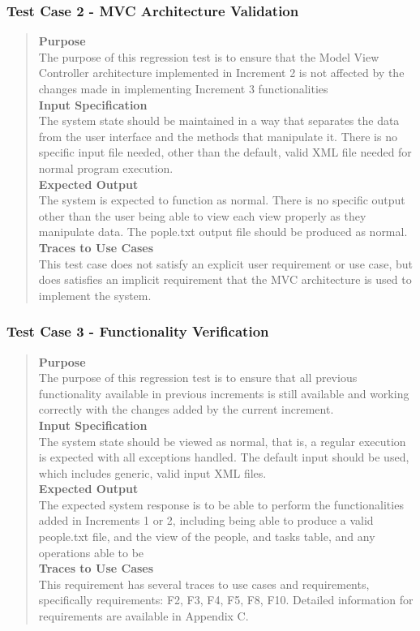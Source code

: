 \documentclass[12pt]{article}
\begin{document}
\subsubsection {Test Case 2 - MVC Architecture Validation}
\begin{quote}
{\bf Purpose}
\\
{
The purpose of this regression test is to ensure that the Model View Controller architecture implemented in Increment 2 is not affected by the changes made in implementing Increment 3 functionalities
}
\\
{\bf Input Specification}
\\
{
The system state should be maintained in a way that separates the data from the user interface and the methods that manipulate it. There is no specific input file needed, other than the default, valid XML file needed for normal program execution.
}
\\
{\bf Expected Output}
\\
{
The system is expected to function as normal. There is no specific output other than the user being able to view each view properly as they manipulate data. The pople.txt output file should be produced as normal.
}
\\
{\bf Traces to Use Cases}
\\
{
This test case does not satisfy an explicit user requirement or use case, but does satisfies an implicit requirement that the MVC architecture is used to implement the system.
}
\end{quote}
\subsubsection{Test Case 3 - Functionality Verification}
\begin{quote}
{\bf Purpose}
\\
{
The purpose of this regression test is to ensure that all previous functionality available in previous increments is still available and working correctly with the changes added by the current increment.
}
\\
{\bf Input Specification}
\\
{
The system state should be viewed as normal, that is, a regular execution is expected with all exceptions handled. The default input should be used, which includes generic, valid input XML files.
}
\\
{\bf Expected Output}
\\
{
The expected system response is to be able to perform the functionalities added in Increments 1 or 2, including being able to produce a valid people.txt file, and the view of the people, and tasks table, and any operations able to be
}
\\
{\bf Traces to Use Cases}
\\
{
This requirement has several traces to use cases and requirements, specifically requirements: F2, F3, F4, F5, F8, F10. Detailed information for requirements are available in Appendix C.
}
\end{quote}
\end{document}
